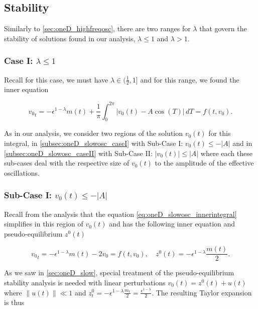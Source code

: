 \subsection{Stability}

Similarly to \autoref{sec:oneD_highfreqosc}, there are two ranges for $\lambda$ that govern the stability of solutions found in our analysis, $\lambda\le 1$ and $\lambda>1$.

\subsubsection{Case I: $\lambda\le 1$}

Recall for this case, we must have $\lambda\in (\frac{1}{2},1]$ and for this range, we found the inner equation

\begin{equation}\label{eq:oneD_slowosc_innerintegral}
{v_0}_t= -\epsilon^{1-\lambda}m(t)+\frac{1}{\pi}\int_0^{2\pi}| v_0(t)- A\cos(T)|\,dT=f(t,v_0).
\end{equation}

As in our analysis, we consider two regions of the solution $v_0(t)$ for this integral, in \autoref{subsec:oneD_slowosc_caseI} with Sub-Case I: $v_0(t)\le - |A|$ and in \autoref{subsec:oneD_slowosc_caseII} with Sub-Case II: $|v_0(t)|\le |A|$ where each these sub-cases deal with the respective size of $v_0(t)$ to the amplitude of the effective oscillations.

\subsubsection*{Sub-Case I: $v_0(t)\le - |A|$}

Recall from the analysis that the equation \eqref{eq:oneD_slowosc_innerintegral} simplifies in this region of $v_0(t)$ and has the following inner equation and pseudo-equilibrium $z^0(t)$

\begin{equation}\label{eq:oneD_slowosc_stabilitysubcaseI}
{v_0}_t= -\epsilon^{1-\lambda}m(t) -2v_0=f(t,v_0), \quad z^0(t)=-\epsilon^{1-\lambda}\frac{m(t)}{2}.
\end{equation}

As we saw in \autoref{sec:oneD_slow}, special treatment of the pseudo-equilibrium stability analysis is needed with linear perturbations $v_0(t)=z^0(t)+u(t)$ where $\lVert u(t)\rVert \ll 1$ and $z^0_t = -\epsilon^{1-\lambda}\frac{m_t}{2}=\frac{\epsilon^{1-\lambda}}{2}$. The resulting Taylor expansion is thus

